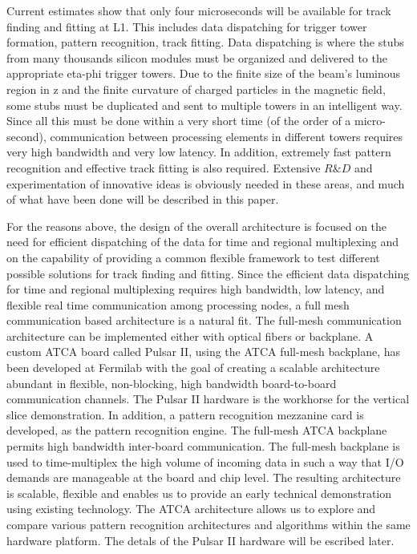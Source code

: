  Current estimates show that only four microseconds will be available for track finding and fitting at L1. This includes data dispatching for trigger tower formation, pattern recognition, track fitting.  Data dispatching is where the stubs from many thousands silicon modules must be organized and delivered to the appropriate eta-phi trigger towers. Due to the finite size of the beam's luminous region in z and the finite curvature of charged particles in the magnetic field, some stubs must be duplicated and sent to multiple towers in an intelligent way. Since all this must be done within a very short time (of the order of a micro-second), communication between processing elements in different towers requires very high bandwidth and very low latency. In addition, extremely fast pattern recognition and effective track fitting is also required. Extensive $R\&D$ and experimentation of innovative ideas is obviously needed in these areas, and much of what have been done will be described in this paper.

	For the reasons above, the design of the overall architecture is focused on the need for efficient dispatching of the data for time and regional multiplexing and on the capability of providing a common flexible framework to test different possible solutions for track finding and fitting. Since the efficient data dispatching for time and regional multiplexing requires high bandwidth, low latency, and flexible real time communication among processing nodes, a full mesh communication based architecture is a natural fit. The full-mesh communication architecture can be implemented either with optical fibers or backplane. A custom ATCA board called Pulsar II, using the ATCA full-mesh backplane,  has been developed at Fermilab with the goal of creating a scalable architecture abundant in flexible, non-blocking, high bandwidth board-to-board communication channels. The Pulsar II hardware is the workhorse for the vertical slice demonstration. In addition, a pattern recognition mezzanine card is developed, as the pattern recognition engine. The full-mesh ATCA backplane permits high bandwidth inter-board communication. The full-mesh backplane is used to time-multiplex the high volume of incoming data in such a way that I/O demands are manageable at the board and chip level. The resulting architecture is scalable, flexible and enables us to provide an early technical demonstration using existing technology. The ATCA architecture allows us to explore and compare various pattern recognition architectures and algorithms within the same hardware platform. The detals of the Pulsar II hardware will be escribed later.
	
